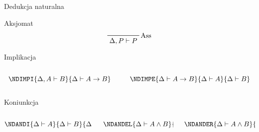 \documentclass{beamer}
\newcommand{\imp}{\rightarrow}
\newcommand{\NDASS}[1]{\prfbyaxiom{Ass}{#1}}
\begin{document}
\begin{frame}{Dedukcja naturalna}

  \pause

  \begin{block}{Aksjomat}
    $$ \NDASS{\Delta, P \vdash P} $$
  \end{block}

  \pause

  \begin{block}{Implikacja}
    \begin{columns}
      \begin{column}{0.5\textwidth}
        $$
        \NDIMPI {\Delta, A \vdash B}
          {\Delta \vdash A \imp B}
        $$
      \end{column}

      \begin{column}{0.5\textwidth}
        $$
        \NDIMPE {\Delta \vdash A \imp B} {\Delta \vdash A}
          {\Delta \vdash B}
        $$
      \end{column}
    \end{columns}
  \end{block}

  \pause

  \begin{block}{Koniunkcja}
    \begin{columns}
      \begin{column}{0.33\textwidth}
        $$
        \NDANDI {\Delta \vdash A} {\Delta \vdash B} 
          {\Delta \vdash A \land B}
        $$
      \end{column}

      \begin{column}{0.33\textwidth}
        $$
        \NDANDEL {\Delta \vdash A \land B}
          {\Delta \vdash A}
        $$
      \end{column}

      \begin{column}{0.33\textwidth}
        $$
        \NDANDER {\Delta \vdash A \land B}
          {\Delta \vdash B}
        $$
      \end{column}
    \end{columns}
  \end{block}
\end{frame}
\end{document}
